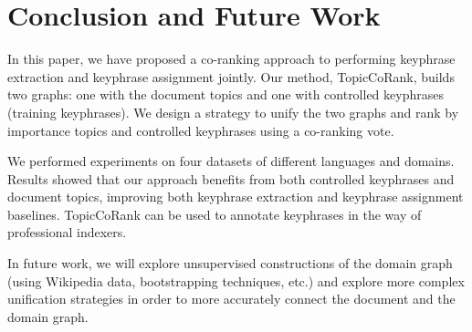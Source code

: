 \section{Conclusion and Future Work}
\label{sec:conclusion}
  In this paper, we have proposed a co-ranking approach to performing keyphrase
  extraction and keyphrase assignment jointly. Our method,
  TopicCoRank, builds two graphs: one with the
  document topics and one with controlled keyphrases (training keyphrases). We
  design a strategy to unify the two graphs and rank by importance topics and
  controlled keyphrases using a co-ranking vote.
  
  We performed experiments on four datasets of different languages and
  domains. Results showed that our approach benefits from both controlled
  keyphrases and document topics, improving both keyphrase extraction and keyphrase assignment
  baselines.
  TopicCoRank can be used to annotate keyphrases in the way of professional
  indexers.

  In future work, we will explore unsupervised constructions of the domain
  graph (using Wikipedia data, bootstrapping techniques, etc.) and explore
  more complex unification strategies in order to more accurately connect the
  document and the domain graph.
